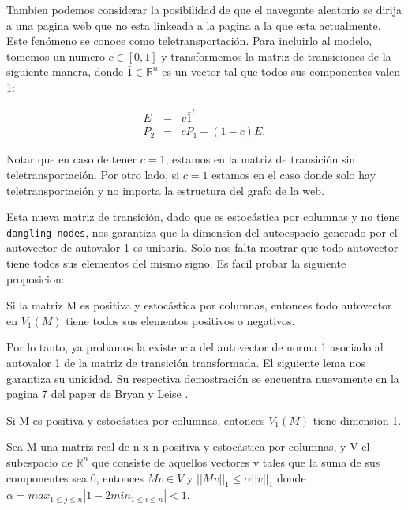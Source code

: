 Tambien podemos considerar la posibilidad de que el navegante aleatorio se dirija a una pagina web que no esta linkeada a la pagina a la que esta actualmente. Este fenómeno se conoce como teletransportación. Para incluirlo al modelo, tomemos un numero $c \in [0,1]$ y transformemos la matriz de transiciones de la siguiente manera, donde $\bar{1} \in \mathbb{R}^n$ es un vector tal que todos sus componentes valen 1:

\begin{eqnarray*}
E & = & v \bar{1}^t \\
P_2 & = & cP_1 + (1-c)E,
\end{eqnarray*}

Notar que en caso de tener $c=1$, estamos en la matriz de transición sin teletransportación. Por otro lado, si $c=1$ estamos en el caso donde solo hay teletransportación y no importa la estructura del grafo de la web.

Esta nueva matriz de transición, dado que es estocástica por columnas y no tiene \texttt{dangling nodes}, nos garantiza que la dimension del autoespacio generado por el autovector de autovalor 1 es unitaria. Solo nos falta mostrar que todo autovector tiene todos sus elementos del mismo signo. Es facil probar la siguiente proposicion:

\begin{proposition}
Si la matriz M es positiva y estocástica por columnas, entonces todo autovector en $V_1(M)$ tiene todos sus elementos positivos o negativos.
\end{proposition}

Por lo tanto, ya probamos la existencia del autovector de norma 1 asociado al autovalor 1 de la matriz de transición transformada. El siguiente lema nos garantiza su unicidad. Su respectiva demostración se encuentra nuevamente en la pagina 7 del paper de Bryan y Leise \cite{Bryan2006}.

\begin{lemma}
\item Si M es positiva y estocástica por columnas, entonces $V_1(M)$ tiene dimension 1.
\end{lemma}

\begin{proposition}
Sea M una matriz real de n x n positiva y estocástica por columnas, y V el subespacio de $\mathbb{R}^n$ que consiste de aquellos vectores v tales que la suma de sus componentes sea 0, entonces $Mv \in V$ y $||Mv||_1 \leq \alpha||v||_1$ donde $\alpha = max_{1 \leq j \leq n}|1 - 2min_{1 \leq i \leq n}| < 1$.
\end{proposition}

